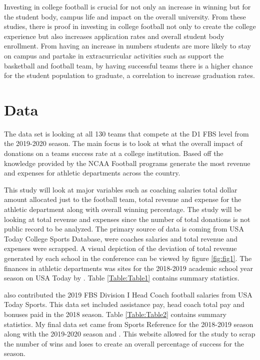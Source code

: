 \documentclass[12pt,english]{article}
\begin{document}
Investing in college football is crucial for not only an increase in winning but for the student body, campus life and impact on the overall university. From these studies, there is proof in investing in college football not only to create the college experience but also increases application rates and overall student body enrollment. From having an increase in numbers students are more likely to stay on campus and partake in extracurricular activities such as support the basketball and football team, by having successful teams there is a higher chance for the student population to graduate, a correlation to increase graduation rates.

\section{Data}\label{sec:data}
The data set is looking at all 130 teams that compete at the D1 FBS level from the 2019-2020 season. The main focus is to look at what the overall impact of donations on a teams success rate at a college institution. Based off the knowledge provided by the NCAA Football programs generate the most revenue and expenses for athletic departments across the country.  

This study will look at major variables such as coaching salaries total dollar amount allocated just to the football team, total revenue and expense for the athletic department along with overall winning percentage.
The study will be looking at total revenue and expenses since the number of total donations is not public record to be analyzed. The primary source of data is coming from USA Today College Sports Database, were coaches salaries and total revenue and expenses were scrapped. A visual depiction of the deviation of total revenue generated by each school in the conference can be viewed by figure \ref{fig:fig1}. The finances in athletic departments was sites for the 2018-2019 academic school year season on USA Today by \citet{Berkowitz}. Table \ref{Table:Table1} contains summary statistics.

\citet{Berkowitz} also contributed the 2019 FBS Division I Head Coach football salaries from USA Today Sports. This data set included assistance pay, head coach total pay and bonuses paid in the 2018 season. Table \ref{Table:Table2} contains summary statistics.
My final data set came from Sports Reference for the 2018-2019 season along with the 2019-2020 season \cite{Sports2018} and \cite{Sports2019}. This website allowed for the study to scrap the number of wins and loses to create an overall percentage of success for the season. 
\end{document}
